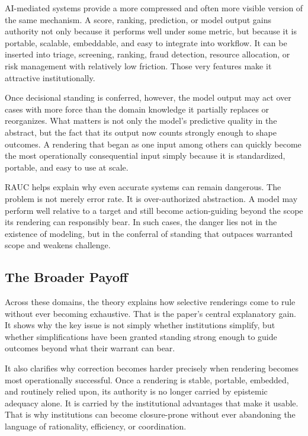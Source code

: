 \documentclass[11pt]{article}
\begin{document}
AI-mediated systems provide a more compressed and often more visible version of the same mechanism. A score, ranking, prediction, or model output gains authority not only because it performs well under some metric, but because it is portable, scalable, embeddable, and easy to integrate into workflow. It can be inserted into triage, screening, ranking, fraud detection, resource allocation, or risk management with relatively low friction. Those very features make it attractive institutionally.\cite{SelbstEtAl2019FairnessAbstraction,ObermeyerEtAl2019DissectingRacialBias}

Once decisional standing is conferred, however, the model output may act over cases with more force than the domain knowledge it partially replaces or reorganizes. What matters is not only the model's predictive quality in the abstract, but the fact that its output now counts strongly enough to shape outcomes. A rendering that began as one input among others can quickly become the most operationally consequential input simply because it is standardized, portable, and easy to use at scale.\cite{SelbstEtAl2019FairnessAbstraction}

RAUC helps explain why even accurate systems can remain dangerous. The problem is not merely error rate. It is over-authorized abstraction. A model may perform well relative to a target and still become action-guiding beyond the scope its rendering can responsibly bear. In such cases, the danger lies not in the existence of modeling, but in the conferral of standing that outpaces warranted scope and weakens challenge.\cite{ObermeyerEtAl2019DissectingRacialBias,FriggNguyen2020ModellingNature}

\subsection{The Broader Payoff}

Across these domains, the theory explains how selective renderings come to rule without ever becoming exhaustive. That is the paper's central explanatory gain. It shows why the key issue is not simply whether institutions simplify, but whether simplifications have been granted standing strong enough to guide outcomes beyond what their warrant can bear.

It also clarifies why correction becomes harder precisely when rendering becomes most operationally successful. Once a rendering is stable, portable, embedded, and routinely relied upon, its authority is no longer carried by epistemic adequacy alone. It is carried by the institutional advantages that make it usable. That is why institutions can become closure-prone without ever abandoning the language of rationality, efficiency, or coordination.
\end{document}
